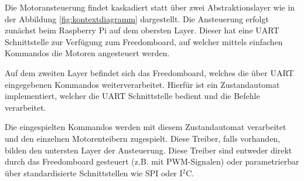 Die Motoransteuerung findet kaskadiert statt über zwei Abstraktionslayer
wie in der Abbildung \ref{fig:kontextdiagramm} dargestellt. Die Ansteuerung
erfolgt zunächst beim Raspberry Pi auf dem obersten Layer. Dieser hat eine
UART Schnittstelle zur Verfügung zum Freedomboard, auf welcher mittels
einfachen Kommandos die Motoren angesteuert werden. 

Auf dem zweiten Layer befindet sich das Freedomboard, welches die über UART
eingegebenen Kommandos weiterverarbeitet. Hierfür ist ein Zustandautomat
implementiert, welcher die UART Schnittstelle bedient und die Befehle
verarbeitet.

Die eingespielten Kommandos werden mit diesem Zustandautomat verarbeitet und
den einzelnen Motorenteibern zugespielt. Diese Treiber, falls vorhanden,
bilden den untersten Layer der Ansteuerung. Diese Treiber sind entweder
direkt durch das Freedomboard gesteuert (z.B. mit PWM-Signalen) oder 
parametrierbar über standardisierte Schnittstellen wie SPI oder I$^2$C.

